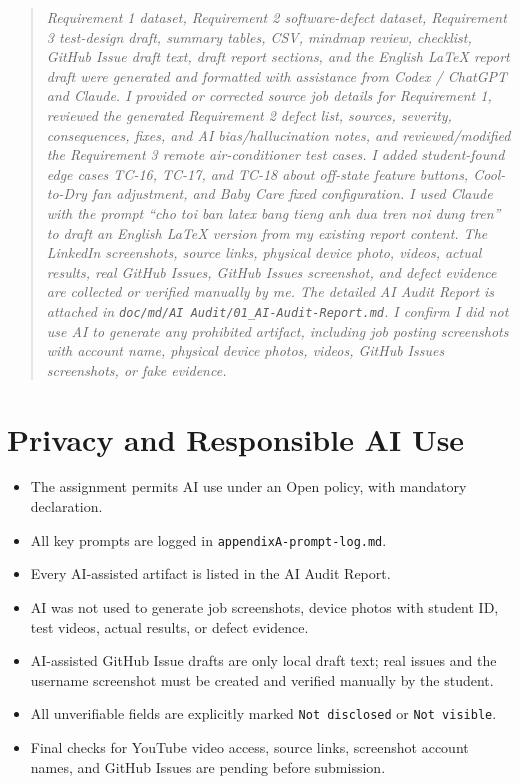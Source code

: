 \documentclass[12pt, a4paper]{article}
\begin{document}
\begin{quote}
\textit{Requirement 1 dataset, Requirement 2 software-defect dataset, Requirement 3 test-design draft, summary tables, CSV, mindmap review, checklist, GitHub Issue draft text, draft report sections, and the English LaTeX report draft were generated and formatted with assistance from Codex / ChatGPT and Claude. I provided or corrected source job details for Requirement 1, reviewed the generated Requirement 2 defect list, sources, severity, consequences, fixes, and AI bias/hallucination notes, and reviewed/modified the Requirement 3 remote air-conditioner test cases. I added student-found edge cases TC-16, TC-17, and TC-18 about off-state feature buttons, Cool-to-Dry fan adjustment, and Baby Care fixed configuration. I used Claude with the prompt ``cho toi ban latex bang tieng anh dua tren noi dung tren'' to draft an English LaTeX version from my existing report content. The LinkedIn screenshots, source links, physical device photo, videos, actual results, real GitHub Issues, GitHub Issues screenshot, and defect evidence are collected or verified manually by me. The detailed AI Audit Report is attached in \texttt{doc/md/AI Audit/01\_AI-Audit-Report.md}. I confirm I did not use AI to generate any prohibited artifact, including job posting screenshots with account name, physical device photos, videos, GitHub Issues screenshots, or fake evidence.}
\end{quote}

\section{Privacy and Responsible AI Use}

\begin{itemize}[leftmargin=*]
  \item[$\checkmark$] The assignment permits AI use under an Open policy, with mandatory declaration.
  \item[$\checkmark$] All key prompts are logged in \texttt{appendixA-prompt-log.md}.
  \item[$\checkmark$] Every AI-assisted artifact is listed in the AI Audit Report.
  \item[$\checkmark$] AI was not used to generate job screenshots, device photos with student ID, test videos, actual results, or defect evidence.
  \item[$\checkmark$] AI-assisted GitHub Issue drafts are only local draft text; real issues and the username screenshot must be created and verified manually by the student.
  \item[$\checkmark$] All unverifiable fields are explicitly marked \texttt{Not disclosed} or \texttt{Not visible}.
  \item[$\checkmark$] Final checks for YouTube video access, source links, screenshot account names, and GitHub Issues are pending before submission.
\end{itemize}
\end{document}
